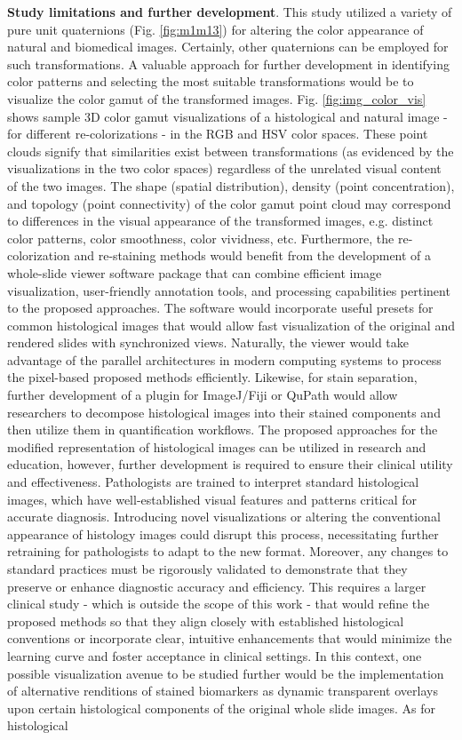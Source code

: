 \documentclass[superscriptaddress,longbibliography,aps,prl,twocolumn,10pt]{revtex4-2}
\begin{document}
\noindent
\textbf{Study limitations and further development}. This study utilized a variety of pure unit quaternions (Fig. \ref{fig:m1m13}) for altering the color appearance of natural and biomedical images. Certainly, other quaternions can be employed for such transformations. A valuable approach for further development in identifying color patterns and selecting the most suitable transformations would be to visualize the color gamut of the transformed images. Fig. \ref{fig:img_color_vis} shows sample 3D color gamut visualizations of a histological and natural image - for different re-colorizations - in the RGB and HSV color spaces. These point clouds signify that similarities exist between transformations (as evidenced by the visualizations in the two color spaces) regardless of the unrelated visual content of the two images. The shape (spatial distribution), density (point concentration), and topology (point connectivity) of the color gamut point cloud may correspond to differences in the visual appearance of the transformed images, e.g. distinct color patterns, color smoothness, color vividness, etc. Furthermore, the re-colorization and re-staining methods would benefit from the development of a whole-slide viewer software package that can combine efficient image visualization, user-friendly annotation tools, and processing capabilities pertinent to the proposed approaches. The software would incorporate useful presets for common histological images that would allow fast visualization of the original and rendered slides with synchronized views. Naturally, the viewer would take advantage of the parallel architectures in modern computing systems to process the pixel-based proposed methods efficiently. Likewise, for stain separation, further development of a plugin for ImageJ/Fiji \cite{Schneider2012, Schindelin2012} or QuPath \cite{Bankhead2017} would allow researchers to decompose histological images into their stained components and then utilize them in quantification workflows. The proposed approaches for the modified representation of histological images can be utilized in research and education, however, further development is required to ensure their clinical utility and effectiveness. Pathologists are trained to interpret standard histological images, which have well-established visual features and patterns critical for accurate diagnosis. Introducing novel visualizations or altering the conventional appearance of histology images could disrupt this process, necessitating further retraining for pathologists to adapt to the new format. Moreover, any changes to standard practices must be rigorously validated to demonstrate that they preserve or enhance diagnostic accuracy and efficiency. This requires a larger clinical study - which is outside the scope of this work - that would refine the proposed methods so that they align closely with established histological conventions or incorporate clear, intuitive enhancements that would minimize the learning curve and foster acceptance in clinical settings. In this context, one possible visualization avenue to be studied further would be the implementation of alternative renditions of stained biomarkers as dynamic transparent overlays upon certain histological components of the original whole slide images. As for histological 
\end{document}
